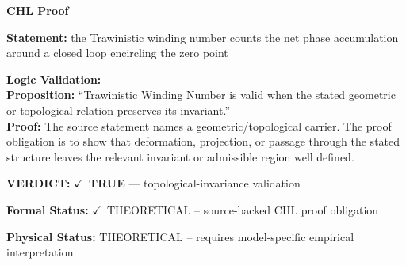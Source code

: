 \vspace{0.45em}
\noindent\textbf{CHL Proof}\par
\textbf{Statement:} the Trawinistic winding number counts the net phase accumulation around a closed loop
encircling the zero point

\textbf{Logic Validation:}\\
\textbf{Proposition:} ``Trawinistic Winding Number is valid when the stated geometric or topological relation
preserves its invariant.''\\
\textbf{Proof:} The source statement names a geometric/topological carrier. The proof obligation is to
show that deformation, projection, or passage through the stated structure leaves the
relevant invariant or admissible region well defined.

\textbf{VERDICT:} \ensuremath{\checkmark}\ \textbf{TRUE} --- topological-invariance validation

\textbf{Formal Status:} \ensuremath{\checkmark}\ THEORETICAL -- source-backed CHL proof obligation

\textbf{Physical Status:} THEORETICAL -- requires model-specific empirical interpretation
\par\vspace{0.45em}
\par
\ifTZPDarkEdition
{}
\fi
\endgroup
\endgroup

